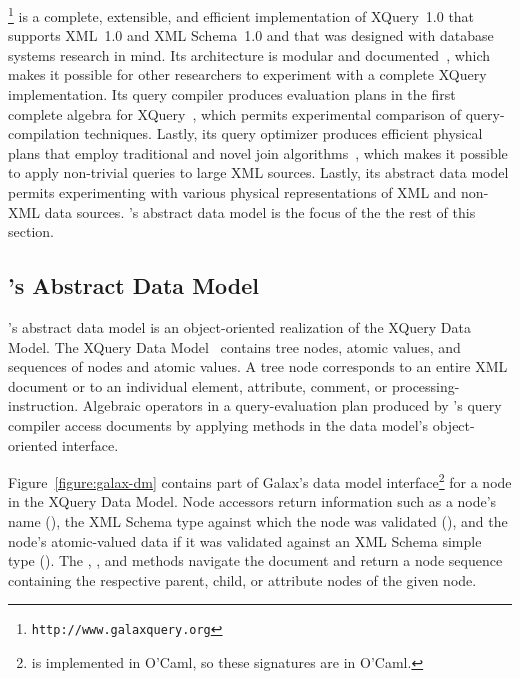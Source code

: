 \Galax{}\footnote{\texttt{http://www.galaxquery.org}} is a complete,
extensible, and efficient implementation of XQuery~1.0 that supports
XML~1.0 and XML Schema~1.0 and that was designed with database systems
research in mind.  Its architecture is modular and
documented~\cite{galax:edbt2004}, which makes it possible for other
researchers to experiment with a complete XQuery implementation.  Its
query compiler produces evaluation plans in the first complete algebra
for XQuery~\cite{galax:icde2006}, which permits experimental
comparison of query-compilation techniques.  Lastly, its query
optimizer produces efficient physical plans that employ traditional
and novel join algorithms~\cite{galax:icde2006}, which makes it
possible to apply non-trivial queries to large XML sources.  Lastly,
its abstract data model permits experimenting with various physical
representations of XML and non-XML data sources.  \Galax{}'s abstract
data model is the focus of the the rest of this section.

\subsection{\Galax{}'s Abstract Data Model}

\Galax{}'s abstract data model is an object-oriented realization of
the XQuery Data Model.  The XQuery Data Model~\cite{XPath:DataModel}
contains tree nodes, atomic values, and sequences of nodes and atomic
values.  A tree node corresponds to an entire XML document or to an
individual element, attribute, comment, or processing-instruction.
Algebraic operators in a query-evaluation plan produced by \Galax{}'s
query compiler access documents by applying methods in the data
model's object-oriented interface.

Figure~\ref{figure:galax-dm} contains part of Galax's data model
interface\footnote{\Galax{} is implemented in O'Caml, so these signatures
are in O'Caml.} for a node in the XQuery Data Model.  Node
accessors return information such as a node's name (),
the XML Schema type against which the node was validated (),
and the node's atomic-valued data if it was validated against an XML
Schema simple type ().  The , ,
and  methods navigate the document and return a node
sequence containing the respective parent, child, or attribute nodes
of the given node.

